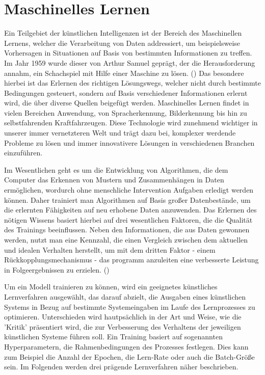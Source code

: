 \section{Maschinelles Lernen} \label{chpt:Stand_der_Technik_Maschinelles_Lernen}
Ein Teilgebiet der künstlichen Intelligenzen ist der Bereich des Maschinellen Lernens, welcher die Verarbeitung von Daten addressiert, um beispielsweise Vorhersagen in Situationen auf Basis von bestimmten Informationen zu treffen.
Im Jahr 1959 wurde dieser von Arthur Samuel geprägt, der die Herausforderung annahm, ein Schachspiel mit Hilfe einer Maschine zu lösen. (\cite[4]{joshi_machine_2020})
Das besondere hierbei ist das Erlernen des richtigen Lösungswegs, welcher nicht durch bestimmte Bedingungen gesteuert, sondern auf Basis verschiedener Informationen erlernt wird, die über diverse Quellen beigefügt werden.
Maschinelles Lernen findet in vielen Bereichen Anwendung, von Spracherkennung, Bilderkennung bis hin zu selbstfahrenden Kraftfahrzeugen. Diese Technologie wird zunehmend wichtiger in unserer immer vernetzteren Welt und trägt dazu bei, komplexer werdende Probleme zu lösen und immer innovativere Lösungen in verschiedenen Branchen einzuführen.

Im Wesentlichen geht es um die Entwicklung von Algorithmen, die dem Computer das Erkennen von Mustern und Zusammenhängen in Daten ermöglichen, wordurch ohne menschliche Intervention Aufgaben erledigt werden können.
Daher trainiert man Algorithmen auf Basis großer Datenbestände, um die erlernten Fähigkeiten auf neu erhobene Daten anzuwenden. Das Erlernen des nötigen Wissens basiert hierbei auf drei wesentlichen Faktoren, die die Qualität des Trainings beeinflussen. Neben den Informationen, die aus Daten gewonnen werden, nutzt man eine Kennzahl, die einen Vergleich zwischen dem aktuellen und idealen Verhalten herstellt, um mit dem dritten Faktor - einem Rückkopplungsmechanismus - das programm anzuleiten eine verbesserte Leistung in Folgeergebnissen zu erzielen. (\cite[4]{joshi_machine_2020})

Um ein Modell trainieren zu können, wird ein geeignetes künstliches Lernverfahren ausgewählt, das darauf abzielt, die Ausgaben eines künstlichen Systems in Bezug auf bestimmte Systemeingaben im Laufe des Lernprozesses zu optimieren. Unterschieden wird hautpsächlich in der Art und Weise, wie die 'Kritik' präsentiert wird, die zur Verbesserung des Verhaltens der jeweiligen künstlichen Systeme führen soll. Ein Training basiert auf sogenannten Hyperparametern, die Rahmenbedingungen des Prozesses festlegen. Dies kann zum Beispiel die Anzahl der Epochen, die Lern-Rate oder auch die Batch-Größe sein. Im Folgenden werden drei prägende Lernverfahren näher beschrieben.
